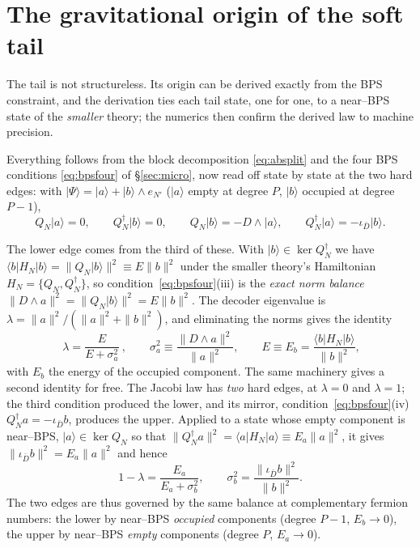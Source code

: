 \documentclass[11pt]{article}
\newcommand{\ket}[1]{\lvert #1\rangle}
\newcommand{\bra}[1]{\langle #1\rvert}
\newcommand{\dg}{^{\dagger}}
\begin{document}
\section{The gravitational origin of the soft tail}
\label{sec:tailorigin}

The tail is not structureless. Its origin can be derived exactly from the BPS constraint, and the
derivation ties each tail state, one for one, to a near--BPS state of the \emph{smaller} theory; the
numerics then confirm the derived law to machine precision.

Everything follows from the block decomposition \eqref{eq:absplit} and the four BPS conditions
\eqref{eq:bpsfour} of \S\ref{sec:micro}, now read off state by state at the two hard edges: with
$\ket\Psi=\ket a+\ket b\wedge e_{N'}$ ($\ket a$ empty at degree $P$, $\ket b$ occupied at degree $P-1$),
\[
  Q_N\ket a=0,\qquad Q_N\dg\ket b=0,\qquad Q_N\ket b=-D\wedge\ket a,\qquad Q_N\dg\ket a=-\iota_{\bar D}\ket b .
\]

The lower edge comes from the third of these. With $\ket b\in\ker Q_N\dg$ we have
$\bra b H_N\ket b=\|Q_N\ket b\|^2\equiv E\|b\|^2$ under the smaller theory's Hamiltonian
$H_N=\{Q_N,Q_N\dg\}$, so condition~\eqref{eq:bpsfour}(iii) is the \emph{exact norm balance}
$\|D\wedge a\|^2=\|Q_N\ket b\|^2=E\|b\|^2$. The decoder eigenvalue is
$\lambda=\|a\|^2/(\|a\|^2+\|b\|^2)$, and eliminating the norms gives the identity
\begin{equation}
  \boxed{\ \lambda=\frac{E}{E+\sigma_a^2}\ },\qquad \sigma_a^2\equiv\frac{\|D\wedge a\|^2}{\|a\|^2},
  \qquad E\equiv E_b=\frac{\bra b H_N\ket b}{\|b\|^2},
  \label{eq:identity}
\end{equation}
with $E_b$ the energy of the occupied component. The same machinery gives a second identity for free.
The Jacobi law has \emph{two} hard edges, at $\lambda=0$ and $\lambda=1$; the third condition produced
the lower, and its mirror, condition~\eqref{eq:bpsfour}(iv) $Q_N\dg a=-\iota_{\bar D}b$, produces the
upper. Applied to a state whose empty component is near--BPS, $\ket a\in\ker Q_N$ so that
$\|Q_N\dg a\|^2=\bra a H_N\ket a\equiv E_a\|a\|^2$, it gives $\|\iota_{\bar D}b\|^2=E_a\|a\|^2$ and hence
\begin{equation}
  1-\lambda=\frac{E_a}{E_a+\sigma_b^2},\qquad \sigma_b^2=\frac{\|\iota_{\bar D}b\|^2}{\|b\|^2}.
  \label{eq:identityup}
\end{equation}
The two edges are thus governed by the same balance at complementary fermion numbers: the lower by
near--BPS \emph{occupied} components (degree $P-1$, $E_b\to0$), the upper by near--BPS \emph{empty}
components (degree $P$, $E_a\to0$).
\end{document}

